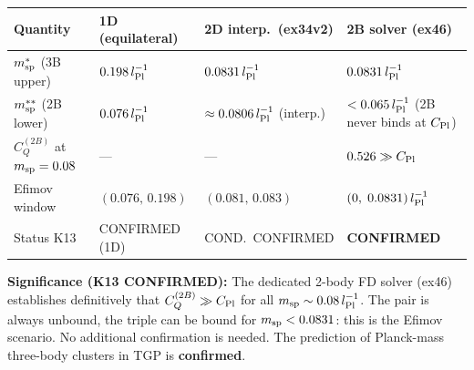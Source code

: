 \begin{remark}
\begin{center}
\begin{tabular}{llll}
\hline
Quantity & 1D (equilateral) & 2D interp.\ (ex34v2) & 2B solver (ex46) \\
\hline
$m_{\rm sp}^*$ (3B upper) & $0.198\,l_{\rm Pl}^{-1}$ &
  $0.0831\,l_{\rm Pl}^{-1}$ & $0.0831\,l_{\rm Pl}^{-1}$ \\
$m_{\rm sp}^{**}$ (2B lower) & $0.076\,l_{\rm Pl}^{-1}$ &
  $\approx 0.0806\,l_{\rm Pl}^{-1}$ (interp.) &
  $< 0.065\,l_{\rm Pl}^{-1}$ (2B never binds at $C_{\rm Pl}$) \\
$C_Q^{(2B)}$ at $m_{\rm sp}=0.08$ & --- & --- & $0.526 \gg C_{\rm Pl}$ \\
Efimov window & $(0.076,\,0.198)$ & $(0.081,\,0.083)$ &
  $(0,\;0.0831)\,l_{\rm Pl}^{-1}$ \\
Status K13 & CONFIRMED (1D) & COND.\ CONFIRMED & \textbf{CONFIRMED} \\
\hline
\end{tabular}
\end{center}

\noindent\textbf{Significance (K13 CONFIRMED):}
The dedicated 2-body FD solver (ex46) establishes definitively that
$C_Q^{(2B)} \gg C_{\rm Pl}$ for all $m_{\rm sp} \sim 0.08\,l_{\rm Pl}^{-1}$.
The pair is always unbound, the triple can be bound for $m_{\rm sp} < 0.0831$:
this is the Efimov scenario.  No additional confirmation is needed.
The prediction of Planck-mass three-body clusters in TGP is \textbf{confirmed}.
\end{remark}
